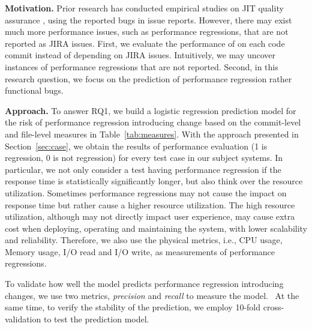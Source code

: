  \textbf{Motivation.}
Prior research has conducted empirical studies on JIT quality assurance \cite{emadjit}, using the reported bugs in issue reports. However, there may exist much more performance issues, such as performance regressions, that are not reported as JIRA issues. First, we evaluate the performance of on each code commit instead of depending on JIRA issues. Intuitively, we may uncover instances of performance regressions that are not reported. Second, in this research question, we focus on the prediction of performance regression rather functional bugs.

 \textbf{Approach.}
To answer RQ1, we build a logistic regression prediction model for the risk of performance regression introducing change based on the commit-level and file-level measures in Table~\ref{tab:measures}. With the approach presented in Section~\ref{sec:case}, we obtain the results of performance evaluation (1 is regression, 0 is not regression) for every test case in our subject systems. In particular, we not only consider a test having performance regression if the response time is statistically significantly longer, but also think over the resource utilization. Sometimes performance regressions may not cause the impact on response time but rather cause a higher resource utilization. The high resource utilization, although may not directly impact user experience, may cause extra cost when deploying, operating and maintaining the system, with lower scalability and reliability. 
Therefore, we also use the physical metrics, i.e., CPU usage, Memory usage, I/O read and I/O write, as measurements of performance regressions. 

To validate how well the model predicts performance regression introducing changes, we use two metrics, \emph{precision} and \emph{recall} to measure the model.  At the same time, to verify the stability of the prediction, we employ 10-fold cross-validation to test the prediction model.

